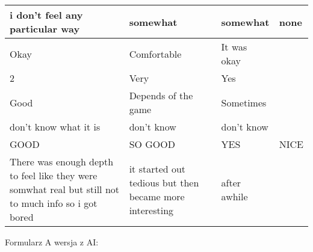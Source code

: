 \begin{table}[!ht]
\begin{tabular}{|m{7.5em}|m{7.5em}|m{7.5em}|m{7.5em}|}
        i don't feel any particular way & somewhat & somewhat & none \\ \hline
        Okay & Comfortable & It was okay & ~ \\ \hline
        2 & Very & Yes & ~ \\ \hline
        Good & Depends of the game & Sometimes & ~ \\ \hline
        don't know what it is & don't know & don't know & ~ \\ \hline
        GOOD & SO GOOD & YES & NICE \\ \hline
        There was enough depth to feel like they were somwhat real but still not to much info so i got bored & it started out tedious but then became more interesting & after awhile & ~ \\ \hline
    \end{tabular}
\end{table}

Formularz A wersja z AI:

